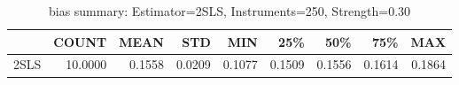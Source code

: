 \begin{table}[ht]
\centering
\caption{bias summary: Estimator=2SLS, Instruments=250, Strength=0.30}
\begin{tabular}{lrrrrrrrr}
\toprule
 & COUNT & MEAN & STD & MIN & 25\% & 50\% & 75\% & MAX \\
\midrule
2SLS & 10.0000 & 0.1558 & 0.0209 & 0.1077 & 0.1509 & 0.1556 & 0.1614 & 0.1864 \\
\bottomrule
\end{tabular}
\end{table}
